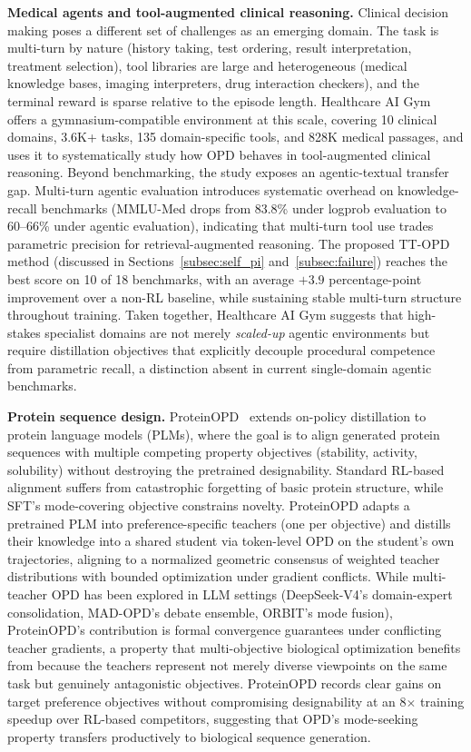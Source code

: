\documentclass{article} %
\begin{document}
\textbf{Medical agents and tool-augmented clinical reasoning.} Clinical decision making poses a different set of challenges as an emerging domain. The task is multi-turn by nature (history taking, test ordering, result interpretation, treatment selection), tool libraries are large and heterogeneous (medical knowledge bases, imaging interpreters, drug interaction checkers), and the terminal reward is sparse relative to the episode length. Healthcare AI Gym~\citep{2605.02943} offers a gymnasium-compatible environment at this scale, covering 10 clinical domains, 3.6K+ tasks, 135 domain-specific tools, and 828K medical passages, and uses it to systematically study how OPD behaves in tool-augmented clinical reasoning. Beyond benchmarking, the study exposes an agentic-textual transfer gap. Multi-turn agentic evaluation introduces systematic overhead on knowledge-recall benchmarks (MMLU-Med drops from 83.8\% under logprob evaluation to 60--66\% under agentic evaluation), indicating that multi-turn tool use trades parametric precision for retrieval-augmented reasoning. The proposed TT-OPD method (discussed in Sections~\ref{subsec:self_pi} and~\ref{subsec:failure}) reaches the best score on 10 of 18 benchmarks, with an average $+3.9$ percentage-point improvement over a non-RL baseline, while sustaining stable multi-turn structure throughout training. Taken together, Healthcare AI Gym suggests that high-stakes specialist domains are not merely \emph{scaled-up} agentic environments but require distillation objectives that explicitly decouple procedural competence from parametric recall, a distinction absent in current single-domain agentic benchmarks.

\textbf{Protein sequence design.} ProteinOPD~\citep{2605.10189} extends on-policy distillation to protein language models (PLMs), where the goal is to align generated protein sequences with multiple competing property objectives (stability, activity, solubility) without destroying the pretrained designability. Standard RL-based alignment suffers from catastrophic forgetting of basic protein structure, while SFT's mode-covering objective constrains novelty. ProteinOPD adapts a pretrained PLM into preference-specific teachers (one per objective) and distills their knowledge into a shared student via token-level OPD on the student's own trajectories, aligning to a normalized geometric consensus of weighted teacher distributions with bounded optimization under gradient conflicts. While multi-teacher OPD has been explored in LLM settings (DeepSeek-V4's domain-expert consolidation, MAD-OPD's debate ensemble, ORBIT's mode fusion), ProteinOPD's contribution is formal convergence guarantees under conflicting teacher gradients, a property that multi-objective biological optimization benefits from because the teachers represent not merely diverse viewpoints on the same task but genuinely antagonistic objectives. ProteinOPD records clear gains on target preference objectives without compromising designability at an 8$\times$ training speedup over RL-based competitors, suggesting that OPD's mode-seeking property transfers productively to biological sequence generation.
\end{document}
